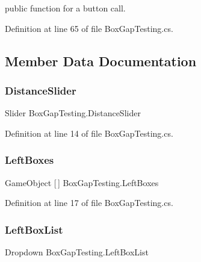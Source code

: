 public function for a button call. 



Definition at line 65 of file Box\+Gap\+Testing.\+cs.



\subsection{Member Data Documentation}
\mbox{\label{class_box_gap_testing_a55a2167175a350189b1b97828c98345a}} 
\subsubsection{\texorpdfstring{Distance\+Slider}{DistanceSlider}}
{\footnotesize\ttfamily Slider Box\+Gap\+Testing.\+Distance\+Slider}



Definition at line 14 of file Box\+Gap\+Testing.\+cs.

\mbox{\label{class_box_gap_testing_a37c3e1b0863c79089e89dcc98828cde6}} 
\subsubsection{\texorpdfstring{Left\+Boxes}{LeftBoxes}}
{\footnotesize\ttfamily Game\+Object \mbox{[}$\,$\mbox{]} Box\+Gap\+Testing.\+Left\+Boxes}



Definition at line 17 of file Box\+Gap\+Testing.\+cs.

\mbox{\label{class_box_gap_testing_af7c91fab5df48aa454e6ee9ab8c1aa14}} 
\subsubsection{\texorpdfstring{Left\+Box\+List}{LeftBoxList}}
{\footnotesize\ttfamily Dropdown Box\+Gap\+Testing.\+Left\+Box\+List}



